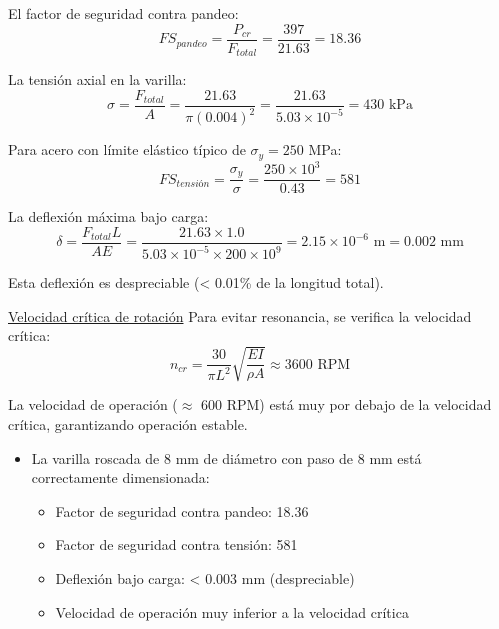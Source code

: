 El factor de seguridad contra pandeo:
\begin{equation}
FS_{pandeo} = \frac{P_{cr}}{F_{total}} = \frac{397}{21.63} = 18.36
\end{equation}

La tensión axial en la varilla:
\begin{equation}
\sigma = \frac{F_{total}}{A} = \frac{21.63}{\pi (0.004)^2} = \frac{21.63}{5.03 \times 10^{-5}} = 430 \text{ kPa}
\end{equation}

Para acero con límite elástico típico de $\sigma_y = 250$ MPa:
\begin{equation}
FS_{tensión} = \frac{\sigma_y}{\sigma} = \frac{250 \times 10^3}{0.43} = 581
\end{equation}

La deflexión máxima bajo carga:
\begin{equation}
\delta = \frac{F_{total} L}{A E} = \frac{21.63 \times 1.0}{5.03 \times 10^{-5} \times 200 \times 10^9} = 2.15 \times 10^{-6} \text{ m} = 0.002 \text{ mm}
\end{equation}

Esta deflexión es despreciable (< 0.01\% de la longitud total).

\underline{Velocidad crítica de rotación}
Para evitar resonancia, se verifica la velocidad crítica:
\begin{equation}
n_{cr} = \frac{30}{\pi L^2} \sqrt{\frac{E I}{\rho A}} \approx 3600 \text{ RPM}
\end{equation}

La velocidad de operación ($\approx$ 600 RPM) está muy por debajo de la velocidad crítica, garantizando operación estable.

\begin{itemize}[label=$\bullet$]
    \item La varilla roscada de 8 mm de diámetro con paso de 8 mm está correctamente dimensionada:
    \begin{itemize}[label=$\bullet$]
        \item Factor de seguridad contra pandeo: 18.36
        \item Factor de seguridad contra tensión: 581
        \item Deflexión bajo carga: < 0.003 mm (despreciable)
        \item Velocidad de operación muy inferior a la velocidad crítica
    \end{itemize}
\end{itemize}